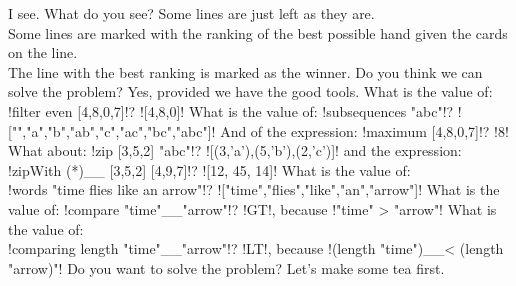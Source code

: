 \hspace*{\fill} 
\lhA I see. 
\lhN What do you see?
\lhA Some lines are just left as they are. \\
Some lines are marked with the ranking of the best possible hand given the cards on the line.\\
The line with the best ranking is marked as the winner.
\lhN Do you think we can solve the problem?
\lhA Yes, provided we have the good tools.
\lhN What is the value of:  \il!filter even [4,8,0,7]!?
\lhA \il![4,8,0]!
\lhN What is the value of:  \il!subsequences "abc"!?
\lhA \il!["","a","b","ab","c","ac","bc","abc"]!
\lhN And of the expression: \il!maximum [4,8,0,7]!? 
\lhA \il!8!
\lhN What about: \il!zip [3,5,2] "abc"!?
\lhA \il![(3,'a'),(5,'b'),(2,'c')]!
\lhN and  the expression: \il!zipWith (*)__ [3,5,2] [4,9,7]!?
\lhA \il![12, 45, 14]!
\lhN What is the value of: \\ \il!words "time flies like an arrow"!?
\lhA \il!["time","flies","like","an","arrow"]!
\lhN What is the value of: \il!compare "time"__"arrow"!?
\lhA \il!GT!, because \il!"time" > "arrow"!
\lhN What is the value of:\\ \il!comparing length "time"__"arrow"!?
\lhA \il!LT!, because \il!(length "time")__< (length "arrow)"!
\lhN Do you want to solve the problem? 
\lhA Let's make some tea first.
\lhend








